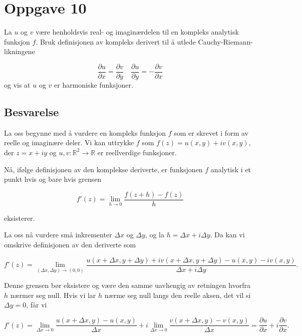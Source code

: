 \section{Oppgave 10}

La $ u $ og $ v $ være henholdsvis real- og imaginærdelen til en kompleks analytisk funksjon $ f $. Bruk definisjonen av kompleks derivert til å utlede Cauchy-Riemann-likningene

\begin{equation*}
    \frac{\partial u}{\partial x}=\frac{\partial v}{\partial y} \quad \frac{\partial u}{\partial y}=-\frac{\partial v}{\partial x}    
\end{equation*}
og vis at $ u $ og $ v $ er harmoniske funksjoner.

\subsection*{Besvarelse}

La oss begynne med å vurdere en kompleks funksjon $ f $ som er skrevet i form av reelle og imaginære deler. Vi kan uttrykke $ f $ som $ f(z) = u(x, y) + iv(x, y) $, der $ z = x + iy $ og $ u, v: \mathbb{R}^2 \rightarrow \mathbb{R} $ er reellverdige funksjoner.

Nå, ifølge definisjonen av den komplekse deriverte, er funksjonen $ f $ analytisk i et punkt hvis og bare hvis grensen

\begin{equation*}
f'(z) = \lim_{h \to 0} \frac{f(z+h)-f(z)}{h}
\end{equation*}

eksisterer.

La oss nå vurdere små inkrementer $ \Delta x $ og $ \Delta y $, og la $ h = \Delta x + i \Delta y $. Da kan vi omskrive definisjonen av den deriverte som

\begin{equation*}
f'(z) = \lim_{(\Delta x, \Delta y) \to (0, 0)} \frac{u(x + \Delta x, y + \Delta y) + i v(x + \Delta x, y + \Delta y) - u(x, y) - iv(x, y)}{\Delta x + i \Delta y}.
\end{equation*}

Denne grensen bør eksistere og være den samme uavhengig av retningen hvorfra $ h $ nærmer seg null. Hvis vi lar $ h $ nærme seg null langs den reelle aksen, det vil si $ \Delta y = 0 $, får vi

\begin{equation*}
f'(z) = \lim_{\Delta x \to 0} \frac{u(x + \Delta x, y) - u(x, y)}{\Delta x} + i \lim_{\Delta x \to 0} \frac{v(x + \Delta x, y) - v(x, y)}{\Delta x} = \frac{\partial u}{\partial x} + i \frac{\partial v}{\partial x}.
\end{equation*}


